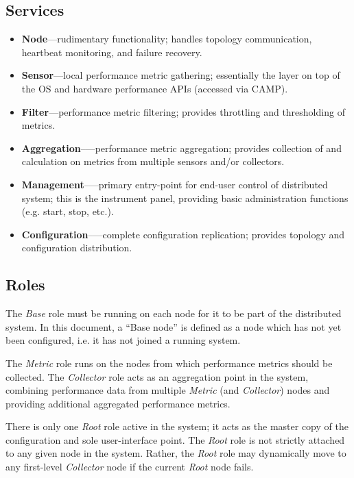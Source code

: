 \subsection{Services}

\begin{itemize}

\item \textbf{Node}---rudimentary \dcamp functionality; handles topology communication, heartbeat monitoring, and failure
      recovery.
\item \textbf{Sensor}---local performance metric gathering; essentially the \dcamp layer on top of the OS and hardware
      performance APIs (accessed via CAMP).
\item \textbf{Filter}---performance metric filtering; provides throttling and thresholding of metrics.
\item \textbf{Aggregation}--—performance metric aggregation; provides collection of and calculation on metrics from
      multiple sensors and/or collectors.
\item \textbf{Management}--—primary entry-point for end-user control of \dcamp distributed system; this is the \dcamp
      instrument panel, providing basic administration functions (e.g. start, stop, etc.).
\item \textbf{Configuration}--—complete configuration replication; provides topology and configuration distribution.

\end{itemize}

\subsection{Roles}

The \textit{Base} role must be running on each node for it to be part of the \dcamp distributed system. In this document,
a ``Base node'' is defined as a \dcamp node which has not yet been configured, i.e. it has not joined a running \dcamp
system.

The \textit{Metric} role runs on the nodes from which performance metrics should be collected. The \textit{Collector}
role acts as an aggregation point in the system, combining performance data from multiple \textit{Metric} (and
\textit{Collector}) nodes and providing additional aggregated performance metrics.

There is only one \textit{Root} role active in the system; it acts as the master copy of the \dcamp configuration and
sole user-interface point. The \textit{Root} role is not strictly attached to any given node in the system. Rather, the
\textit{Root} role may dynamically move to any first-level \textit{Collector} node if the current \textit{Root} node
fails.

